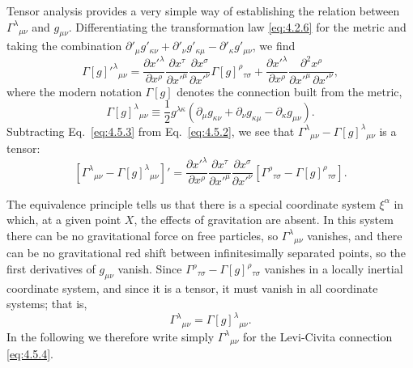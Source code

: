 Tensor analysis provides a very simple way of establishing the relation
between \(\Gamma^\lambda{}_{\mu\nu}\) and \(g_{\mu\nu}\). Differentiating
the transformation law \eqref{eq:4.2.6} for the metric and taking the
combination
\(\partial'_\mu g'_{\kappa\nu}+\partial'_\nu g'_{\kappa\mu}
-\partial'_\kappa g'_{\mu\nu}\), we find
\begin{equation}
  \Gamma[g]'^\lambda{}_{\mu\nu}
  =
  \frac{\partial x'^\lambda}{\partial x^\rho}
  \frac{\partial x^\tau}{\partial x'^\mu}
  \frac{\partial x^\sigma}{\partial x'^\nu}
  \Gamma[g]^\rho{}_{\tau\sigma}
  +
  \frac{\partial x'^\lambda}{\partial x^\rho}
  \frac{\partial^2x^\rho}
       {\partial x'^\mu\,\partial x'^\nu},
  \tag{4.5.3}\label{eq:4.5.3}
\end{equation}
where the modern notation \(\Gamma[g]\) denotes the connection built from the
metric,
\begin{equation}
  \Gamma[g]^\lambda{}_{\mu\nu}
  \equiv
  \frac12 g^{\lambda\kappa}
  \left(
    \partial_\mu g_{\kappa\nu}
    +\partial_\nu g_{\kappa\mu}
    -\partial_\kappa g_{\mu\nu}
  \right).
  \tag{4.5.4}\label{eq:4.5.4}
\end{equation}
Subtracting Eq.~\eqref{eq:4.5.3} from Eq.~\eqref{eq:4.5.2}, we see that
\(\Gamma^\lambda{}_{\mu\nu}-\Gamma[g]^\lambda{}_{\mu\nu}\) is a tensor:
\begin{equation}
  \left[
    \Gamma^\lambda{}_{\mu\nu}
    -\Gamma[g]^\lambda{}_{\mu\nu}
  \right]'
  =
  \frac{\partial x'^\lambda}{\partial x^\rho}
  \frac{\partial x^\tau}{\partial x'^\mu}
  \frac{\partial x^\sigma}{\partial x'^\nu}
  \left[
    \Gamma^\rho{}_{\tau\sigma}
    -\Gamma[g]^\rho{}_{\tau\sigma}
  \right].
  \tag{4.5.5}\label{eq:4.5.5}
\end{equation}

The equivalence principle tells us that there is a special coordinate system
\(\xi^\alpha\) in which, at a given point \(X\), the effects of gravitation
are absent. In this system there can be no gravitational force on free
particles, so \(\Gamma^\lambda{}_{\mu\nu}\) vanishes, and there can be no
gravitational red shift between infinitesimally separated points, so the
first derivatives of \(g_{\mu\nu}\) vanish. Since
\(\Gamma^\rho{}_{\tau\sigma}-\Gamma[g]^\rho{}_{\tau\sigma}\) vanishes in a
locally inertial coordinate system, and since it is a tensor, it must vanish
in all coordinate systems; that is,
\begin{equation}
  \Gamma^\lambda{}_{\mu\nu}
  =
  \Gamma[g]^\lambda{}_{\mu\nu}.
  \tag{4.5.6}\label{eq:4.5.6}
\end{equation}
In the following we therefore write simply
\(\Gamma^\lambda{}_{\mu\nu}\) for the Levi-Civita connection
\eqref{eq:4.5.4}.

